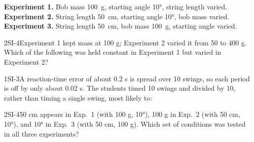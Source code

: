 \documentclass[11pt]{article}
\begin{document}
\textbf{Experiment 1.} Bob mass \SI{100}{\gram}, starting angle \ang{10}, string length varied.\\
\textbf{Experiment 2.} String length \SI{50}{\centi\metre}, starting angle \ang{10}, bob mass varied.\\
\textbf{Experiment 3.} String length \SI{50}{\centi\metre}, bob mass \SI{100}{\gram}, starting angle varied.

\passageend

\begin{q}{2}{SI-4}{Experiment 1 kept mass at 100 g; Experiment 2 varied it from 50 to 400 g.}
Which of the following was held constant in Experiment 1 but varied in Experiment 2?
\end{q}

\begin{q}{1}{SI-3}{A reaction-time error of about 0.2 s is spread over 10 swings, so each period is off by only about 0.02 s.}
The students timed 10 swings and divided by 10, rather than timing a single swing, most likely to:
\end{q}

\begin{q}{2}{SI-4}{50 cm appears in Exp.\ 1 (with 100 g, \ang{10}), 100 g in Exp.\ 2 (with 50 cm, \ang{10}), and \ang{10} in Exp.\ 3 (with 50 cm, 100 g).}
Which set of conditions was tested in all three experiments?
\end{q}
\end{document}
